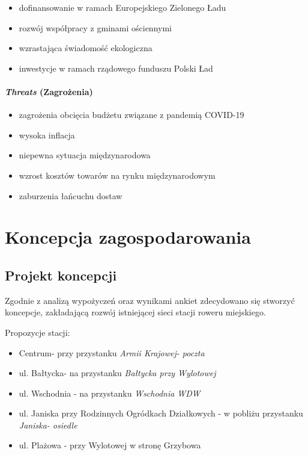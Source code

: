 \documentclass{amuthesis}
\begin{document}
\begin{itemize}
\item
  dofinansowanie w ramach Europejskiego Zielonego Ładu
\item
  rozwój współpracy z gminami ościennymi
\item
  wzrastająca świadomość ekologiczna
\item
  inwestycje w ramach rządowego funduszu Polski Ład
\end{itemize}

\hypertarget{threats-zagroux17cenia}{%
\subsubsection{\texorpdfstring{\emph{Threats} (Zagrożenia)}{Threats (Zagrożenia)}}\label{threats-zagroux17cenia}}

\begin{itemize}
\item
  zagrożenia obcięcia budżetu związane z pandemią COVID-19
\item
  wysoka inflacja
\item
  niepewna sytuacja międzynarodowa
\item
  wzrost kosztów towarów na rynku międzynarodowym
\item
  zaburzenia łańcuchu dostaw
\end{itemize}

\hypertarget{koncepcja_zag}{%
\chapter{Koncepcja zagospodarowania}\label{koncepcja_zag}}

\hypertarget{projekt-koncepcji}{%
\section{Projekt koncepcji}\label{projekt-koncepcji}}

Zgodnie z analizą wypożyczeń oraz wynikami ankiet zdecydowano się stworzyć koncepcje, zakładającą rozwój istniejącej sieci stacji roweru miejskiego.

Propozycje stacji:

\begin{itemize}
\item
  Centrum- przy przystanku \emph{Armii Krajowej- poczta}
\item
  ul. Bałtycka- na przystanku \emph{Bałtycka przy Wylotowej}
\item
  ul. Wschodnia - na przystanku \emph{Wschodnia WDW}
\item
  ul. Janiska przy Rodzinnych Ogródkach Działkowych - w pobliżu przystanku \emph{Janiska- osiedle}
\item
  ul. Plażowa - przy Wylotowej w stronę Grzybowa
\end{itemize}
\end{document}
